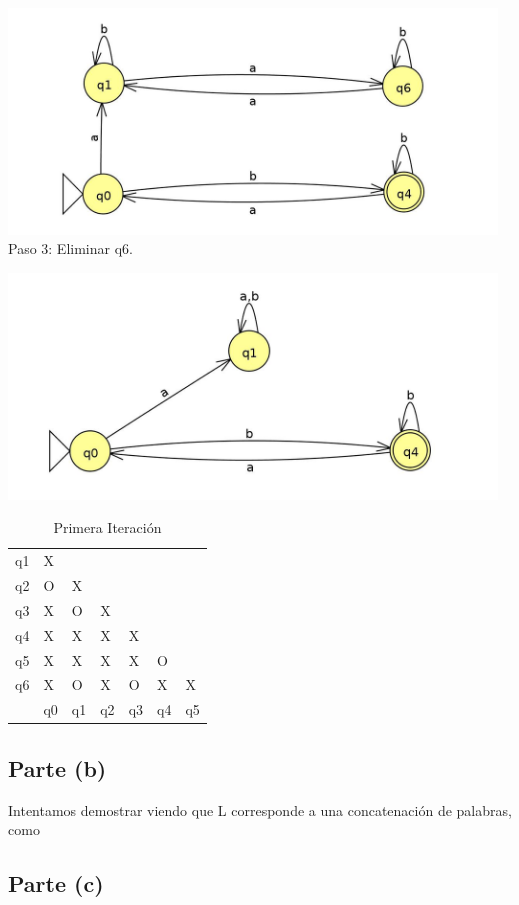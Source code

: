\documentclass[11pt,letterpaper]{article}
\begin{document}
\includegraphics[height=6cm]{tarea_1-a-3.png}
\\ Paso 3: Eliminar q6.

\includegraphics[height=6cm]{tarea_1-a-4.png}
\begin{table}[h]
\centering
\label{tabla_min}
\begin{tabular}{lllllll}
q1 & X  &    &    &    &    &    \\
q2 & O  & X  &    &    &    &    \\
q3 & X  & O  & X  &    &    &    \\
q4 & X  & X  & X  & X  &    &    \\
q5 & X  & X  & X  & X  & O  &    \\
q6 & X  & O  & X  & O  & X  & X  \\
   & q0 & q1 & q2 & q3 & q4 & q5
\end{tabular}
\caption{Primera Iteración}
\end{table}

\subsection{Parte (b)}
Intentamos demostrar viendo que L corresponde a una concatenación de palabras, como  

\subsection{Parte (c)}
\end{document}
